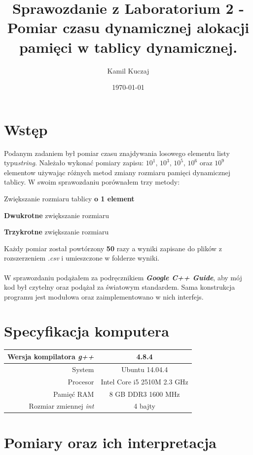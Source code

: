 \documentclass[11pt,a4paper]{article}
\author{Kamil Kuczaj}
\title{Sprawozdanie z Laboratorium 2 - Pomiar czasu dynamicznej alokacji pamięci w tablicy dynamicznej.}
\date{\today}
\begin{document}
\maketitle

\section{Wstęp}
Podanym zadaniem był pomiar czasu znajdywania losowego elementu listy typu\textit{string}. Należało wykonać pomiary zapisu: $10^1$, $10^3$, $10^5$, $10^6$ oraz $10^9$ elementow używając różnych metod zmiany rozmiaru pamięci dynamicznej tablicy. W swoim sprawozdaniu porównałem trzy metody:
\begin{list}{•}{}
\item Zwiększanie rozmiaru tablicy \textbf{o 1 element}
\item \textbf{Dwukrotne} zwiększanie rozmiaru
\item \textbf{Trzykrotne} zwiększanie rozmiaru
\end{list}
\smallskip
Każdy pomiar został powtórzony \textbf{50} razy a wyniki zapisane do plików z rozszerzeniem \textit{.csv} i umieszczone w folderze wyniki.\\\\
W sprawozdaniu podążałem za podręcznikiem \textit{\textbf{Google C++ Guide}}, aby mój kod był czytelny oraz podążał za światowym standardem. Sama konstrukcja programu jest modułowa oraz zaimplementowano w nich interfejs.

\section{Specyfikacja komputera}

\begin{center}
	\begin{tabular}{| r | c |}
	\hline
	Wersja kompilatora \textit{g++} & 4.8.4 \\ \hline
	System & Ubuntu 14.04.4 \\ \hline
	Procesor	 & Intel Core i5 2510M 2.3 GHz \\ \hline
	Pamięć RAM & 8 GB DDR3 1600 MHz \\ \hline
	Rozmiar zmiennej \textit{int} & 4 bajty \\ \hline
	\end{tabular}
\end{center}

\section{Pomiary oraz ich interpretacja}
\end{document}
